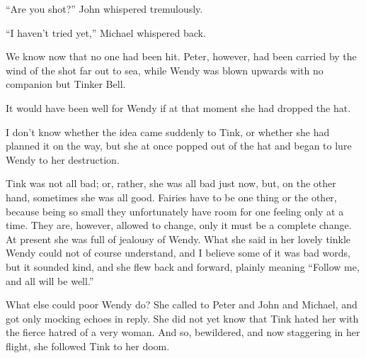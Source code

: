 ``Are you shot?'' John whispered tremulously.

``I haven't tried yet,'' Michael whispered back.

We know now that no one had been hit. Peter, however, had been carried by the
wind of the shot far out to sea, while Wendy was blown upwards with no companion
but Tinker Bell.

It would have been well for Wendy if at that moment she had dropped the hat.

I don't know whether the idea came suddenly to Tink, or whether she had planned
it on the way, but she at once popped out of the hat and began to lure Wendy to
her destruction.

Tink was not all bad; or, rather, she was all bad just now, but, on the other
hand, sometimes she was all good. Fairies have to be one thing or the other,
because being so small they unfortunately have room for one feeling only at a
time. They are, however, allowed to change, only it must be a complete change.
At present she was full of jealousy of Wendy. What she said in her lovely tinkle
Wendy could not of course understand, and I believe some of it was bad words,
but it sounded kind, and she flew back and forward, plainly meaning ``Follow me,
and all will be well.''

What else could poor Wendy do? She called to Peter and John and Michael, and got
only mocking echoes in reply. She did not yet know that Tink hated her with the
fierce hatred of a very woman. And so, bewildered, and now staggering in her
flight, she followed Tink to her doom.
